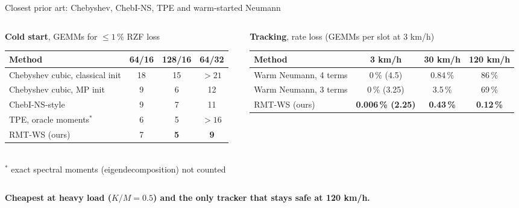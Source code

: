 \documentclass[aspectratio=169,11pt,xcolor=table]{beamer}
\newcommand{\best}[1]{\textbf{\textcolor{good}{#1}}}
\newcommand{\ours}{\rowcolor{good!15}}
\newcommand{\takeaway}[1]{%
  \vfill
  \begin{alertblock}{}\centering\textbf{#1}\end{alertblock}}
\begin{document}
\begin{frame}{Closest prior art: Chebyshev, ChebI-NS, TPE and warm-started Neumann}
  \begin{columns}[T]
    \begin{column}{0.47\textwidth}
      \footnotesize\textbf{Cold start}, GEMMs for $\le 1\,\%$ RZF loss\\[1mm]
      \scriptsize\setlength{\tabcolsep}{3pt}
      \begin{tabular}{lccc}
        \toprule
        Method & 64/16 & 128/16 & 64/32 \\
        \midrule
        Chebyshev cubic, classical init & 18 & 15 & $>21$ \\
        Chebyshev cubic, MP init & 9 & 6 & 12 \\
        ChebI-NS-style & 9 & 7 & 11 \\
        TPE, oracle moments$^\ast$ & 6 & 5 & $>16$ \\
        \ours RMT-WS (ours) & 7 & \best{5} & \best{9} \\
        \bottomrule
      \end{tabular}\\[1mm]
      \tiny $^\ast$ exact spectral moments (eigendecomposition) not counted
    \end{column}
    \begin{column}{0.51\textwidth}
      \footnotesize\textbf{Tracking}, rate loss (GEMMs per slot at 3 km/h)\\[1mm]
      \scriptsize\setlength{\tabcolsep}{2pt}
      \begin{tabular}{lccc}
        \toprule
        Method & 3 km/h & 30 km/h & 120 km/h \\
        \midrule
        Warm Neumann, 4 terms & 0\,\% (4.5) & 0.84\,\% & 86\,\% \\
        Warm Neumann, 3 terms & 0\,\% (3.25) & 3.5\,\% & 69\,\% \\
        \ours RMT-WS (ours) & \best{0.006\,\% (2.25)} & \best{0.43\,\%} & \best{0.12\,\%} \\
        \bottomrule
      \end{tabular}
    \end{column}
  \end{columns}
  \takeaway{Cheapest at heavy load ($K/M = 0.5$) and the only tracker that stays safe at 120 km/h.}
\end{frame}
\end{document}
